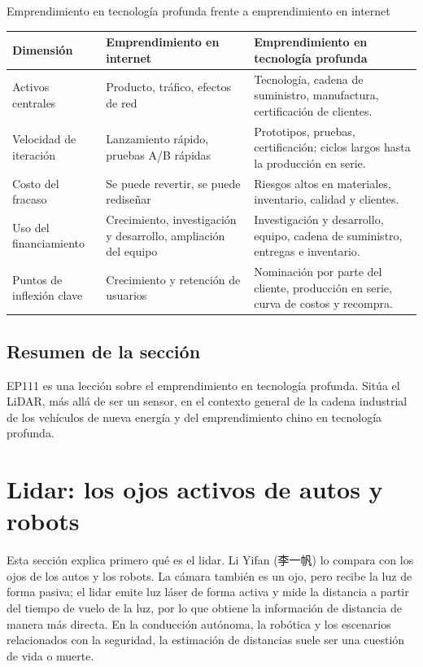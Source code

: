 \documentclass[a4paper]{article}
\begin{document}
\begin{knowledgebox}{Emprendimiento en tecnología profunda frente a emprendimiento en internet}
\begin{tabularx}{\textwidth}{p{}p{}X}
\toprule
Dimensión & Emprendimiento en internet & Emprendimiento en tecnología profunda \\
\midrule
Activos centrales & Producto, tráfico, efectos de red & Tecnología, cadena de suministro, manufactura, certificación de clientes. \\
Velocidad de iteración & Lanzamiento rápido, pruebas A/B rápidas & Prototipos, pruebas, certificación; ciclos largos hasta la producción en serie. \\
Costo del fracaso & Se puede revertir, se puede rediseñar & Riesgos altos en materiales, inventario, calidad y clientes. \\
Uso del financiamiento & Crecimiento, investigación y desarrollo, ampliación del equipo & Investigación y desarrollo, equipo, cadena de suministro, entregas e inventario. \\
Puntos de inflexión clave & Crecimiento y retención de usuarios & Nominación por parte del cliente, producción en serie, curva de costos y recompra. \\
\bottomrule
\end{tabularx}
\end{knowledgebox}

\subsection{Resumen de la sección}

EP111 es una lección sobre el emprendimiento en tecnología profunda. Sitúa el LiDAR, más allá de ser un sensor, en el contexto general de la cadena industrial de los vehículos de nueva energía y del emprendimiento chino en tecnología profunda.
\section{Lidar: los ojos activos de autos y robots}

Esta sección explica primero qué es el lidar. Li Yifan (李一帆) lo compara con los ojos de los autos y los robots. La cámara también es un ojo, pero recibe la luz de forma pasiva; el lidar emite luz láser de forma activa y mide la distancia a partir del tiempo de vuelo de la luz, por lo que obtiene la información de distancia de manera más directa. En la conducción autónoma, la robótica y los escenarios relacionados con la seguridad, la estimación de distancias suele ser una cuestión de vida o muerte.
\end{document}
